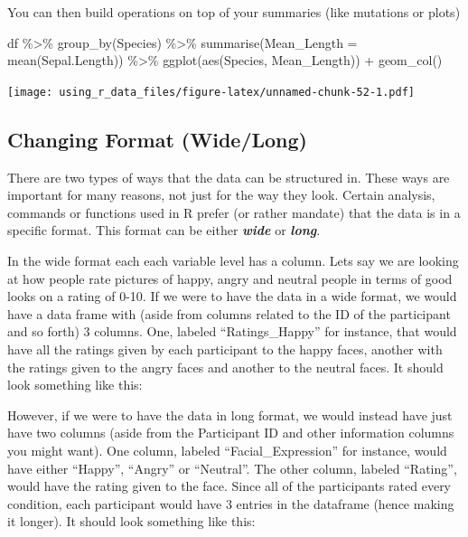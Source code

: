 \documentclass[
]{book}
\newenvironment{Shaded}{\begin{snugshade}}{\end{snugshade}}
\newcommand{\AttributeTok}[1]{\textcolor[rgb]{0.77,0.63,0.00}{#1}}
\newcommand{\FunctionTok}[1]{\textcolor[rgb]{0.00,0.00,0.00}{#1}}
\newcommand{\NormalTok}[1]{#1}
\newcommand{\SpecialCharTok}[1]{\textcolor[rgb]{0.00,0.00,0.00}{#1}}
\begin{document}
You can then build operations on top of your summaries (like mutations or plots)

\begin{Shaded}
\begin{Highlighting}[]
\NormalTok{df }\SpecialCharTok{\%\textgreater{}\%} 
  \FunctionTok{group\_by}\NormalTok{(Species) }\SpecialCharTok{\%\textgreater{}\%} 
  \FunctionTok{summarise}\NormalTok{(}\AttributeTok{Mean\_Length =} \FunctionTok{mean}\NormalTok{(Sepal.Length)) }\SpecialCharTok{\%\textgreater{}\%} 
  \FunctionTok{ggplot}\NormalTok{(}\FunctionTok{aes}\NormalTok{(Species, Mean\_Length)) }\SpecialCharTok{+} 
  \FunctionTok{geom\_col}\NormalTok{()}
\end{Highlighting}
\end{Shaded}

\texttt{[image: using\_r\_data\_files/figure-latex/unnamed-chunk-52-1.pdf]}

\hypertarget{changing-format-widelong}{%
\subsection{Changing Format (Wide/Long)}\label{changing-format-widelong}}

There are two types of ways that the data can be structured in.
These ways are important for many reasons, not just for the way they look.
Certain analysis, commands or functions used in R prefer (or rather mandate) that the data is in a specific format.
This format can be either \textbf{\emph{wide}} or \textbf{\emph{long}}.

In the wide format each each variable level has a column.
Lets say we are looking at how people rate pictures of happy, angry and neutral people in terms of good looks on a rating of 0-10.
If we were to have the data in a wide format, we would have a data frame with (aside from columns related to the ID of the participant and so forth) 3 columns.
One, labeled ``Ratings\_Happy'' for instance, that would have all the ratings given by each participant to the happy faces, another with the ratings given to the angry faces and another to the neutral faces.
It should look something like this:

However, if we were to have the data in long format, we would instead have just have two columns (aside from the Participant ID and other information columns you might want).
One column, labeled ``Facial\_Expression'' for instance, would have either ``Happy'', ``Angry'' or ``Neutral''.
The other column, labeled ``Rating'', would have the rating given to the face.
Since all of the participants rated every condition, each participant would have 3 entries in the dataframe (hence making it longer).
It should look something like this:
\end{document}
